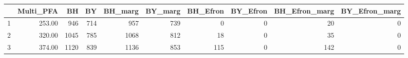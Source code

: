 \begin{table}[ht]
\centering
\begin{tabular}{rrrrrrrrrr}
  \hline
 & Multi\_PFA & BH & BY & BH\_marg & BY\_marg & BH\_Efron & BY\_Efron & BH\_Efron\_marg & BY\_Efron\_marg \\ 
  \hline
1 & 253.00 & 946 & 714 & 957 & 739 &   0 &   0 &  20 &   0 \\ 
  2 & 320.00 & 1045 & 785 & 1068 & 812 &  18 &   0 &  35 &   0 \\ 
  3 & 374.00 & 1120 & 839 & 1136 & 853 & 115 &   0 & 142 &   0 \\ 
   \hline
\end{tabular}
\end{table}
